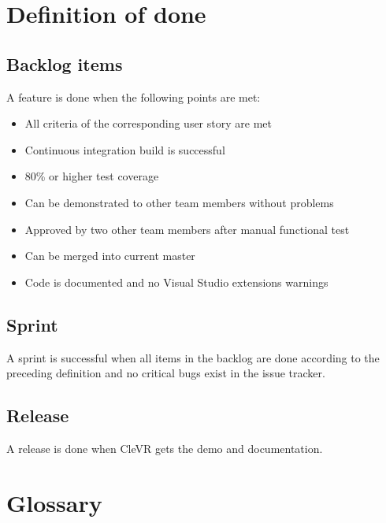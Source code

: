 \documentclass[11pt]{article}
\begin{document}
\section{Definition of done}

	\subsection{Backlog items}
	A feature is done when the following points are met:
	\begin{itemize}
		\item All criteria of the corresponding user story are met
		\item Continuous integration build is successful
		\item 80\% or higher test coverage
	    \item Can be demonstrated to other team members without problems
		\item Approved by two other team members after manual functional test
	    \item Can be merged into current master
	    \item Code is documented and no Visual Studio extensions warnings
	\end{itemize}

	\subsection{Sprint}
	A sprint is successful when all items in the backlog are done according to the preceding definition and no critical bugs exist in the issue tracker.

	\subsection{Release}
	A release is done when \gls{CleVR} gets the demo and documentation.

\section{Glossary}
\printglossary[title=]
\end{document}
